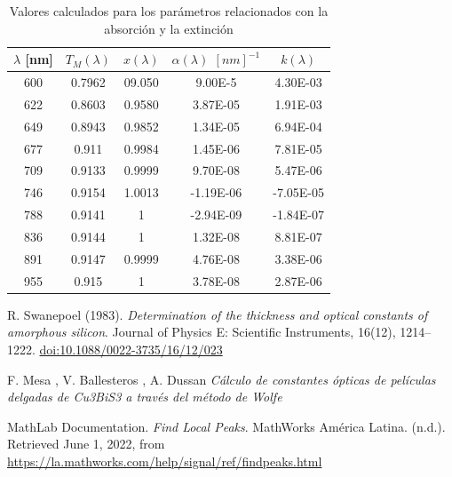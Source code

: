 \documentclass[article]{article}
\begin{document}
    \begin{table}[H]
    \centering
    \begin{tabular}{|c|c|c|c|c|}
        \hline
         $\lambda$ [nm] & $T_M(\lambda)$ & $x(\lambda)$ & $\alpha(\lambda)$ $[nm]^{-1}$ & $k(\lambda)$ \\
         \hline
         600 &0.7962 &09.050 &9.00E-5 &4.30E-03 \\ \hline
         622&0.8603&0.9580&3.87E-05&1.91E-03\\ \hline
         649&0.8943&0.9852&1.34E-05&6.94E-04\\ \hline
         677&0.911&0.9984&1.45E-06&7.81E-05\\ \hline
         709&0.9133&0.9999&9.70E-08&5.47E-06\\ \hline
         746&0.9154&1.0013&-1.19E-06&-7.05E-05\\ \hline
         788&0.9141&1&-2.94E-09&-1.84E-07\\ \hline
         836&0.9144&1&1.32E-08&8.81E-07\\ \hline
         891&0.9147&0.9999&4.76E-08&3.38E-06\\ \hline
         955&0.915&1&3.78E-08&2.87E-06\\ \hline
    \end{tabular}
    \caption{Valores calculados para los parámetros relacionados con la absorción y la extinción}
    \label{tab: Datos x,alpha,k}
    \end{table}
        
    
    
    
\begin{thebibliography}{}

R. Swanepoel (1983). \textit{Determination of the thickness and optical constants of amorphous silicon}. Journal of Physics E: Scientific Instruments, 16(12), 1214–1222. \href{http://iopscience.iop.org/0022-3735/16/12/023}{doi:10.1088/0022-3735/16/12/023}

F. Mesa , V. Ballesteros
, A. Dussan
\textit{Cálculo de constantes ópticas de películas
delgadas de Cu3BiS3 a través del método de Wolfe}


MathLab Documentation. \textit{Find Local Peaks}. MathWorks América Latina. (n.d.). Retrieved June 1, 2022, from \url{https://la.mathworks.com/help/signal/ref/findpeaks.html} 

\end{thebibliography}
\end{document}
